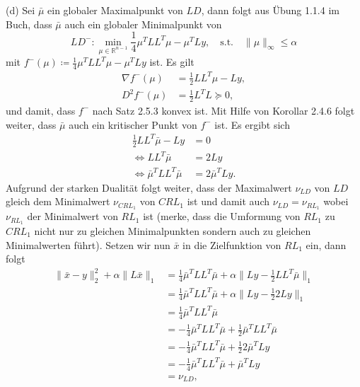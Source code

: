 \documentclass[ngerman, a4paper,12pt]{article}
\begin{document}
\par
(d) Sei $\bar{\mu}$ ein globaler Maximalpunkt von $LD$, dann folgt aus Übung 1.1.4 im Buch, dass $\bar{\mu}$ auch ein globaler Minimalpunkt von
\begin{equation*}
	LD^-: \min_{\mu \in \mathbb{R}^{n-1}} \frac{1}{4}\mu^TLL^T\mu - \mu^TLy, \quad \text{s.t.} \quad \|\mu \|_{\infty}\leq \alpha 
\end{equation*}
mit $f^-(\mu) \coloneqq \frac{1}{4}\mu^TLL^T\mu - \mu^TLy$ ist. Es gilt
\begin{equation*}
	\begin{split}
		\nabla f^-(\mu) &= \frac{1}{2} LL^T\mu - Ly, \\
		D^2f^-(\mu) &= \frac{1}{2} L^TL \succeq 0,
	\end{split}
\end{equation*}
und damit, dass $f^-$ nach Satz 2.5.3 konvex ist. Mit Hilfe von Korollar 2.4.6 folgt weiter, dass $\bar{\mu}$ auch ein kritischer Punkt von $f^-$ ist. Es ergibt sich
\begin{equation}
\label{eq:22d}
	\begin{split}
			\frac{1}{2}LL^T \bar{\mu} - Ly&=0 \\
			\Leftrightarrow LL^T \bar{\mu} &= 2Ly \\
			\Leftrightarrow \bar{\mu}^T LL^T \bar{\mu} &= 2\bar{\mu}^TLy.
	\end{split}
\end{equation}
Aufgrund der starken Dualität folgt weiter, dass der Maximalwert $\nu_{LD}$ von $LD$ gleich dem Minimalwert $\nu_{CRL_1}$ von $CRL_1$ ist und damit auch $\nu_{LD}=\nu_{RL_1}$ wobei $\nu_{RL_1}$ der Minimalwert von $RL_1$ ist (merke, dass die Umformung von $RL_1$ zu $CRL_1$ nicht nur zu gleichen Minimalpunkten sondern auch zu gleichen Minimalwerten führt). Setzen wir nun $\bar{x}$ in die Zielfunktion von $RL_1$ ein, dann folgt
\begin{equation*}
	\begin{split}
		\|\bar{x} - y\|_2^2 + \alpha \| L\bar{x}\|_1 &= \frac{1}{4}\bar{\mu}^TLL^T\bar{\mu} + \alpha \|Ly - \frac{1}{2}LL^T\bar{\mu} \|_1 \\
		&=  \frac{1}{4}\bar{\mu}^TLL^T\bar{\mu} + \alpha \|Ly - \frac{1}{2}2Ly \|_1 \\
		&= \frac{1}{4}\bar{\mu}^TLL^T\bar{\mu} \\
		&= -\frac{1}{4}\bar{\mu}^TLL^T\bar{\mu} + \frac{1}{2}\bar{\mu}^TLL^T\bar{\mu}\\
		&= -\frac{1}{4}\bar{\mu}^TLL^T\bar{\mu} + \frac{1}{2} 2\bar{\mu}^TLy\\
		&= -\frac{1}{4}\bar{\mu}^TLL^T\bar{\mu} + \bar{\mu}^TLy \\
		&= \nu_{LD},
	\end{split}
\end{equation*}
\end{document}
